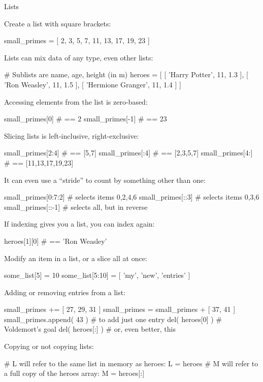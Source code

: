 \documentclass[a4paper,landscape,columns=3]{cheatsheet}
\def\sect#1{\begin{tcolorbox}[colback=blue!5!white,colframe=blue!75!black,size=title,leftrule=2mm]
    \large #1
\end{tcolorbox}}
\begin{document}
\sect{Lists}

Create a list with square brackets:
\begin{python}
small_primes = [ 2, 3, 5, 7, 11, 13, 17, 19, 23 ]
\end{python}

Lists can mix data of any type, even other lists:
\begin{python}
# Sublists are name, age, height (in m)
heroes = [ [ 'Harry Potter', 11, 1.3 ],
           [ 'Ron Weasley', 11, 1.5 ],
           [ 'Hermione Granger', 11, 1.4 ] ]
\end{python}

Accessing elements from the list is zero-based:
\begin{python}
small_primes[0]   # == 2
small_primes[-1]  # == 23
\end{python}

Slicing lists is left-inclusive, right-exclusive:
\begin{python}
small_primes[2:4] # == [5,7]
small_primes[:4]  # == [2,3,5,7]
small_primes[4:]  # == [11,13,17,19,23]
\end{python}

It can even use a ``stride'' to count by something other than one:
\begin{python}
small_primes[0:7:2]     # selects items 0,2,4,6
small_primes[::3]       # selects items 0,3,6
small_primes[::-1]      # selects all, but in reverse
\end{python}

If indexing gives you a list, you can index again:
\begin{python}
heroes[1][0]        # == 'Ron Weasley'
\end{python}

Modify an item in a list, or a slice all at once:
\begin{python}
some_list[5] = 10
some_list[5:10] = [ 'my', 'new', 'entries' ]
\end{python}

Adding or removing entries from a list:
\begin{python}
small_primes += [ 27, 29, 31 ]
small_primes = small_primes + [ 37, 41 ]
small_primes.append( 43 )  # to add just one entry
del( heroes[0] )    # Voldemort's goal
del( heroes[:] )    # or, even better, this
\end{python}

Copying or not copying lists:
\begin{python}
# L will refer to the same list in memory as heroes:
L = heroes
# M will refer to a full copy of the heroes array:
M = heroes[:]
\end{python}
\end{document}
